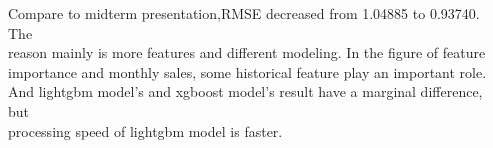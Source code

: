 \documentclass{tikzposter} %
\begin{document}
\begin{columns}
{%
}


{
\begin{description}


  \item
  Compare to midterm presentation,RMSE decreased from 1.04885 to 0.93740. The \\
reason mainly is more features and different modeling. In the figure of feature \\
importance and monthly sales, some historical feature play an important role. \\
And lightgbm model’s and xgboost model’s result have a marginal difference, but \\
processing speed of lightgbm model is faster.
\end{description}
}





\end{columns}
\end{document}
